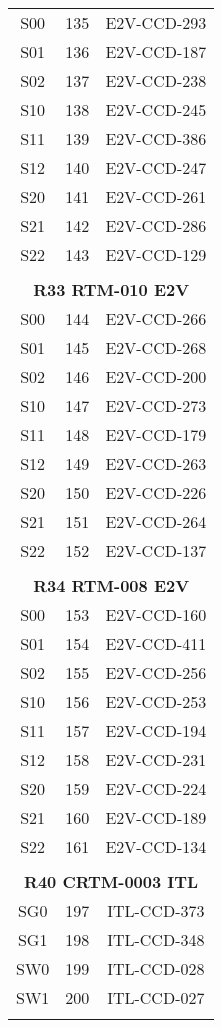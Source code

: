 \begin{longtable}{ccc}
\hline
  S00 & 135 & E2V-CCD-293 \\
  S01 & 136 & E2V-CCD-187 \\
  S02 & 137 & E2V-CCD-238 \\
  S10 & 138 & E2V-CCD-245 \\
  S11 & 139 & E2V-CCD-386 \\
  S12 & 140 & E2V-CCD-247 \\
  S20 & 141 & E2V-CCD-261 \\
  S21 & 142 & E2V-CCD-286 \\
  S22 & 143 & E2V-CCD-129 \\
 & & \\
\multicolumn{3}{c}{\bf R33  RTM-010  E2V} \\
\hline
  S00 & 144 & E2V-CCD-266 \\
  S01 & 145 & E2V-CCD-268 \\
  S02 & 146 & E2V-CCD-200 \\
  S10 & 147 & E2V-CCD-273 \\
  S11 & 148 & E2V-CCD-179 \\
  S12 & 149 & E2V-CCD-263 \\
  S20 & 150 & E2V-CCD-226 \\
  S21 & 151 & E2V-CCD-264 \\
  S22 & 152 & E2V-CCD-137 \\
 & & \\
\multicolumn{3}{c}{\bf R34  RTM-008  E2V} \\
\hline
  S00 & 153 & E2V-CCD-160 \\
  S01 & 154 & E2V-CCD-411 \\
  S02 & 155 & E2V-CCD-256 \\
  S10 & 156 & E2V-CCD-253 \\
  S11 & 157 & E2V-CCD-194 \\
  S12 & 158 & E2V-CCD-231 \\
  S20 & 159 & E2V-CCD-224 \\
  S21 & 160 & E2V-CCD-189 \\
  S22 & 161 & E2V-CCD-134 \\
 & & \\
\multicolumn{3}{c}{\bf R40  CRTM-0003  ITL} \\
\hline
  SG0 & 197 & ITL-CCD-373 \\
  SG1 & 198 & ITL-CCD-348 \\
  SW0 & 199 & ITL-CCD-028 \\
  SW1 & 200 & ITL-CCD-027 \\
 & & \\

\end{longtable}
